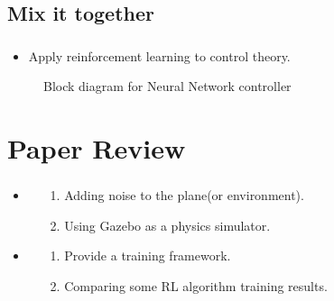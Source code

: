 \documentclass{beamer}
\begin{document}
    \subsection*{Mix it together}
    \begin{frame}
        \frametitle{\subsecname}
        \begin{itemize}
            \item Apply reinforcement learning to control theory.
        \end{itemize}

        \begin{figure}
            \centering
            
            \caption{Block diagram for Neural Network controller}
        \end{figure}

    \end{frame}

    \section{Paper Review}
    \begin{frame}
        \frametitle{\secname}

        \begin{itemize}
            \item {}
                \begin{itemize}
                    \item[1.] Adding noise to the plane(or environment).
                    \item[2.] Using Gazebo as a physics simulator.
                \end{itemize}
            \item {}
                \begin{itemize}
                    \item[1.] Provide a training framework.
                    \item[2.] Comparing some RL algorithm training results.
                \end{itemize}
        \end{itemize}

    \end{frame}

\end{document}
